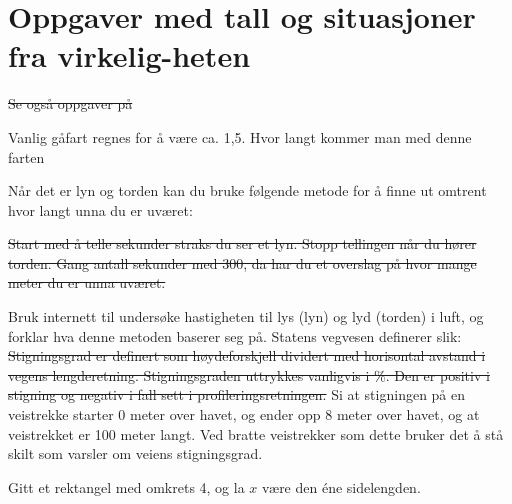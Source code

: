 





\section[Oppgaver med tall og situasjoner fra virkeligheten]{Oppgaver med tall og situasjoner fra virkelig-heten}	
\st{Se også oppgaver på }

Vanlig gåfart regnes for å være ca. 1,5. Hvor langt kommer man med denne farten
	
Når det er lyn og torden kan du bruke følgende metode for å finne ut omtrent hvor langt unna du er uværet:\os

\st{Start med å telle sekunder straks du ser et lyn. Stopp tellingen når du hører torden. Gang antall sekunder med 300, da har du et overslag på hvor mange meter du er unna uværet.}

Bruk internett til undersøke hastigheten til lys (lyn) og lyd (torden) i luft, og forklar hva denne metoden baserer seg på.
\newpage
{}
Statens vegvesen definerer  slik:
\st{
Stigningsgrad er definert som høydeforskjell dividert med horisontal avstand i vegens lengderetning.
Stigningsgraden uttrykkes vanligvis i \%. Den er positiv i stigning og negativ i fall sett i
profileringsretningen.
}
Si at stigningen på en veistrekke starter 0 meter over havet, og ender opp 8 meter over havet, og at veistrekket er 100 meter langt. Ved bratte veistrekker som dette bruker det å stå skilt som varsler om veiens stigningsgrad.

Gitt et rektangel med omkrets 4, og la $ x $ være den éne sidelengden.

